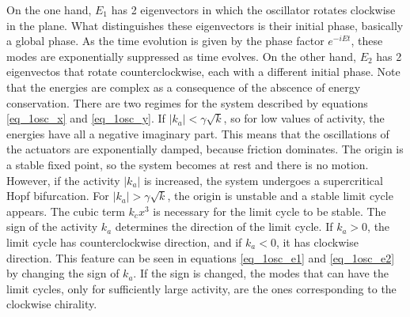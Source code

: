 \documentclass[11pt, a4paper]{article} %
\begin{document}
    On the one hand, $E_1$ has 2 eigenvectors in which the oscillator rotates clockwise in the plane. 
    What distinguishes these eigenvectors is their initial phase, basically a global phase. As the time evolution is given by the 
    phase factor $e^{-iEt}$, these modes are exponentially suppressed as time evolves.
    On the other hand, $E_2$ has 2 eigenvectos that rotate counterclockwise, each with a different initial phase. 
    Note that the energies are complex as a consequence of the abscence of energy conservation. 
    There are two regimes for the system described by equations \eqref{eq_1osc_x} and \eqref{eq_1osc_y}. 
    If $|k_a| < \gamma \sqrt{k}$, so for low values of activity, the energies have all a negative imaginary part. 
    This means that the oscillations of the actuators are exponentially damped, because friction dominates. The origin is a stable fixed point, 
    so the system becomes at rest and there is no motion. However, if the activity $|k_a|$ is increased, the system undergoes a supercritical 
    Hopf bifurcation. For $|k_a| > \gamma \sqrt{k}$, the origin is unstable and a stable limit cycle appears. The cubic 
    term $k_cx^3$ is necessary for the limit cycle to be stable. The sign of the activity $k_a$ determines the direction of 
    the limit cycle. If $k_a>0$, the limit cycle has counterclockwise direction, and if $k_a<0$, it has clockwise direction. 
    This feature can be seen in equations \eqref{eq_1osc_e1} and \eqref{eq_1osc_e2} by changing the sign of $k_a$. If the sign is changed, 
    the modes that can have the limit cycles, only for sufficiently large activity, are the ones corresponding to the clockwise chirality. 
\end{document}
